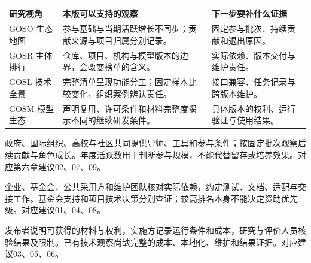 \begingroup\sffamily\fontsize{10}{15}\selectfont\renewcommand{\arraystretch}{1.45}
\noindent\begin{tabularx}{\linewidth}{@{}p{28mm}X p{37mm}@{}}\toprule
研究视角 & 本版可以支持的观察 & 下一步要补什么证据\\\midrule
GOSO 生态地图 & 参与基础与当期活跃增长不同步；贡献来源与项目归属分别记录。 & 固定参与批次、持续贡献和退出原因。\\
GOSR 主体排行 & 仓库、项目、机构与模型版本的边界，会改变榜单的含义。 & 实际依赖、版本交付与维护责任。\\
GOSL 技术全景 & 完整清单呈现功能分工；固定样本比较变化，组织案例辨认责任。 & 接口兼容、任务记录与跨版本维护。\\
GOSM 模型生态 & 声明复用、许可条件和材料完整度揭示不同的继续研发条件。 & 具体版本的权利、运行验证与使用结果。\\\bottomrule
\end{tabularx}\endgroup
{}

政府、国际组织、高校与社区共同提供导师、工具和参与条件；按固定批次观察后续贡献与角色成长。年度活跃数用于判断参与规模，不能代替留存或培养效果。对应第六章建议02、07、09。

企业、基金会、公共采用方和维护团队核对实际依赖，约定测试、文档、适配与交接工作。基金会支持和项目技术决策分别查证；较高排名本身不能决定资助优先级。对应建议01、04、08。

发布者说明可获得的材料与权利，实施方记录运行条件和成本，研究与评价人员核验结果及限制。已有技术观察尚缺完整的成本、本地化、维护和结果证据。对应建议03、05、06。

